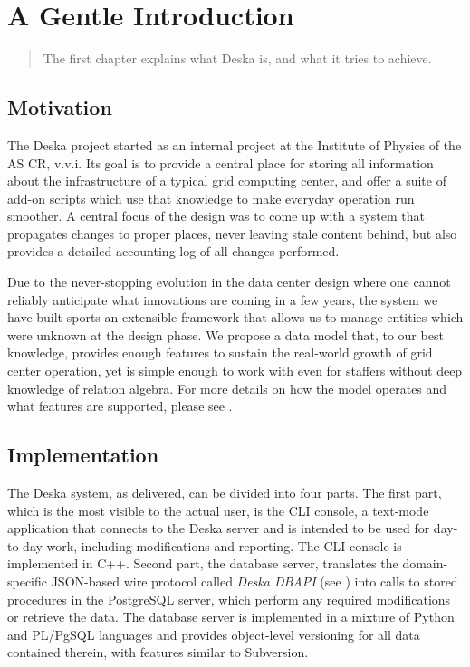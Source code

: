 \documentclass[deska]{subfiles}
\begin{document}
\chapter{A Gentle Introduction}

\begin{abstract}
The first chapter explains what Deska is, and what it tries to achieve.
\end{abstract}

\section{Motivation}

The Deska project started as an internal project at the Institute of Physics of the AS CR, v.v.i\@.  Its goal is to
provide a central place for storing all information about the infrastructure of a typical grid computing center, and
offer a suite of add-on scripts which use that knowledge to make everyday operation run smoother.  A central focus of
the design was to come up with a system that propagates changes to proper places, never leaving stale content behind,
but also provides a detailed accounting log of all changes performed.

Due to the never-stopping evolution in the data center design where one cannot reliably anticipate what innovations are
coming in a few years, the system we have built sports an extensible framework that allows us to manage entities which
were unknown at the design phase.  We propose a data model that, to our best knowledge, provides enough features to
sustain the real-world growth of grid center operation, yet is simple enough to work with even for staffers without deep
knowledge of relation algebra.  For more details on how the model operates and what features are supported, please see
.

\section{Implementation}

The Deska system, as delivered, can be divided into four parts.  The first part, which is the most visible to the actual
user, is the CLI console, a text-mode application that connects to the Deska server and is intended to be used for
day-to-day work, including modifications and reporting.  The CLI console is implemented in C++.  Second part, the
database server, translates the domain-specific JSON-based wire protocol called {\em Deska DBAPI} (see
) into calls to stored procedures in the PostgreSQL server, which perform any required
modifications or retrieve the data.  The database server is implemented in a mixture of Python and PL/PgSQL languages
and provides object-level versioning for all data contained therein, with features similar to Subversion.
\end{document}

